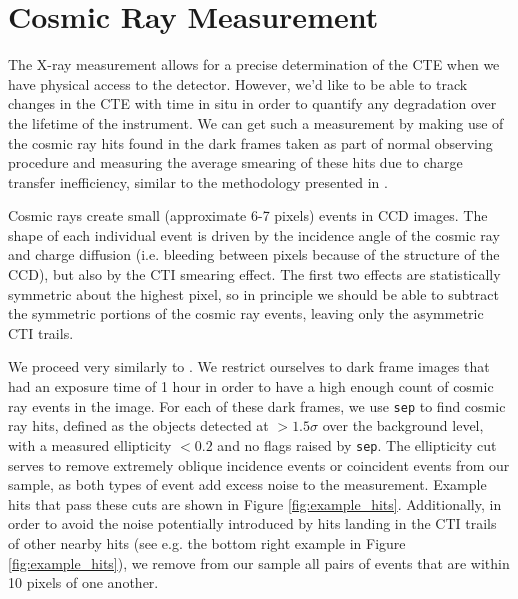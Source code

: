 \section{Cosmic Ray Measurement}
The X-ray measurement allows for a precise determination of the CTE when we have physical access to the detector. However, we'd like to be able to track changes in the CTE with time in situ in order to quantify any degradation over the lifetime of the instrument. We can get such a measurement by making use of the cosmic ray hits found in the dark frames taken as part of normal observing procedure and measuring the average smearing of these hits due to charge transfer inefficiency, similar to the methodology presented in \cite{riess_time_1999}.

Cosmic rays create small (approximate 6-7 pixels) events in CCD images. The shape of each individual event is driven by the incidence angle of the cosmic ray and charge diffusion (i.e. bleeding between pixels because of the structure of the CCD), but also by the CTI smearing effect. The first two effects are statistically symmetric about the highest pixel, so in principle we should be able to subtract the symmetric portions of the cosmic ray events, leaving only the asymmetric CTI trails.

We proceed very similarly to \cite{riess_time_1999}. We restrict ourselves to dark frame images that had an exposure time of 1 hour in order to have a high enough count of cosmic ray events in the image. For each of these dark frames, we use \verb|sep| to find cosmic ray hits, defined as the objects detected at $>1.5\sigma$ over the background level, with a measured ellipticity $< 0.2$ and no flags raised by \verb|sep|. The ellipticity cut serves to remove extremely oblique incidence events or coincident events from our sample, as both types of event add excess noise to the measurement. Example hits that pass these cuts are shown in Figure \ref{fig:example_hits}. Additionally, in order to avoid the noise potentially introduced by hits landing in the CTI trails of other nearby hits (see e.g. the bottom right example in Figure \ref{fig:example_hits}), we remove from our sample all pairs of events that are within 10 pixels of one another.

